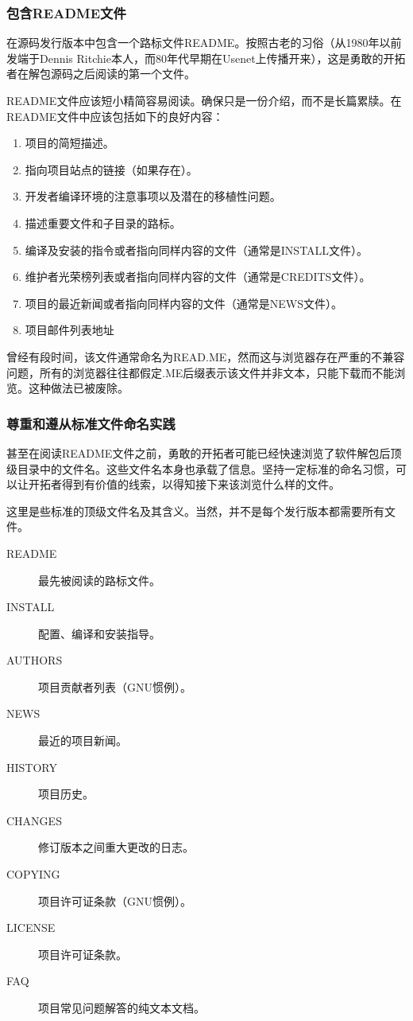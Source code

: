 \documentclass[12pt,oneside]{book}
\begin{document}
\subsubsection{包含README文件}
在源码发行版本中包含一个路标文件README。按照古老的习俗（从1980年以前发端于Dennis Ritchie本人，而80年代早期在Usenet上传播开来），这是勇敢的开拓者在解包源码之后阅读的第一个文件。

README文件应该短小精简容易阅读。确保只是一份介绍，而不是长篇累牍。在README文件中应该包括如下的良好内容：
\begin{enumerate}
\item 项目的简短描述。
\item 指向项目站点的链接（如果存在）。
\item 开发者编译环境的注意事项以及潜在的移植性问题。
\item 描述重要文件和子目录的路标。
\item 编译及安装的指令或者指向同样内容的文件（通常是INSTALL文件）。
\item 维护者光荣榜列表或者指向同样内容的文件（通常是CREDITS文件）。
\item 项目的最近新闻或者指向同样内容的文件（通常是NEWS文件）。
\item 项目邮件列表地址
\end{enumerate}

曾经有段时间，该文件通常命名为READ.ME，然而这与浏览器存在严重的不兼容问题，所有的浏览器往往都假定.ME后缀表示该文件并非文本，只能下载而不能浏览。这种做法已被废除。

\subsubsection{尊重和遵从标准文件命名实践}
甚至在阅读README文件之前，勇敢的开拓者可能已经快速浏览了软件解包后顶级目录中的文件名。这些文件名本身也承载了信息。坚持一定标准的命名习惯，可以让开拓者得到有价值的线索，以得知接下来该浏览什么样的文件。

这里是些标准的顶级文件名及其含义。当然，并不是每个发行版本都需要所有文件。
\begin{description}
\item[README] 最先被阅读的路标文件。
\item[INSTALL] 配置、编译和安装指导。
\item[AUTHORS] 项目贡献者列表（GNU惯例）。
\item[NEWS] 最近的项目新闻。
\item[HISTORY] 项目历史。
\item[CHANGES] 修订版本之间重大更改的日志。
\item[COPYING] 项目许可证条款（GNU惯例）。
\item[LICENSE] 项目许可证条款。
\item[FAQ] 项目常见问题解答的纯文本文档。
\end{description}
\end{document}
